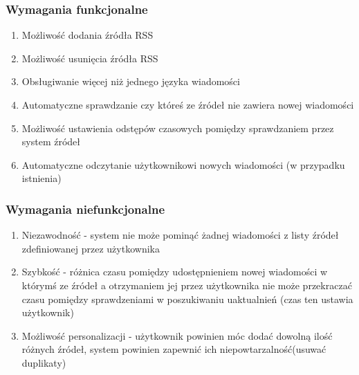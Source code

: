 \subsubsection{Wymagania funkcjonalne}
\begin{enumerate}
	\item Możliwość dodania źródła RSS
	\item Możliwość usunięcia źródła RSS
	\item Obsługiwanie więcej niż jednego języka wiadomości
	\item Automatyczne sprawdzanie czy któreś ze źródeł nie zawiera nowej wiadomości
	\item Możliwość ustawienia odstępów czasowych pomiędzy sprawdzaniem przez system źródeł
	\item Automatyczne odczytanie użytkownikowi nowych wiadomości (w przypadku istnienia) 
\end{enumerate}  
\subsubsection{Wymagania niefunkcjonalne}
\begin{enumerate}
	\item Niezawodność - system nie może pominąć żadnej wiadomości z listy źródeł zdefiniowanej przez użytkownika
	\item Szybkość - różnica czasu pomiędzy udostępnieniem nowej wiadomości w którymś ze źródeł a otrzymaniem jej przez użytkownika nie może przekraczać czasu pomiędzy sprawdzeniami w poszukiwaniu uaktualnień (czas ten ustawia użytkownik)
	\item Możliwość personalizacji - użytkownik powinien móc dodać dowolną ilość różnych źródeł, system powinien zapewnić ich niepowtarzalność(usuwać duplikaty)
\end{enumerate}

